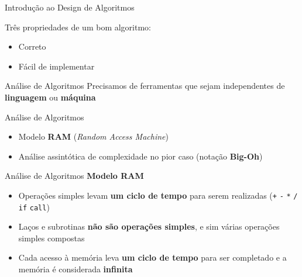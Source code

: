 \documentclass[10pt]{beamer}
\subtitle{Aula 2}
\date{01 de novembro de 2019}
\begin{document}
\maketitle

\begin{frame}{Introdução ao Design de Algoritmos}
  \huge

  Três propriedades de um bom algoritmo:

  \begin{itemize}
      \item \huge Correto
      \item \huge Fácil de implementar
  \end{itemize}
\end{frame}

\begin{frame}{Análise de Algoritmos}
  \huge Precisamos de ferramentas que sejam independentes de \textbf{linguagem} ou \textbf{máquina}
\end{frame}

\begin{frame}{Análise de Algoritmos}
  \huge
  \begin{itemize}
    \item Modelo \textbf{RAM} (\textit{Random Access Machine})
    \item Análise assintótica de complexidade no pior caso (notação \textbf{Big-Oh})
  \end{itemize}
\end{frame}

\begin{frame}{Análise de Algoritmos}
  \huge \textbf{Modelo RAM}

  \Large
  \begin{itemize}
    \item Operações simples levam \textbf{um ciclo de tempo} para serem realizadas (\texttt{+} \texttt{-} \texttt{*} \texttt{/} \texttt{if} \texttt{call})
    \item Laços e subrotinas \textbf{não são operações simples}, e sim várias operações simples compostas
    \item Cada acesso à memória leva \textbf{um ciclo de tempo} para ser completado e a memória é considerada \textbf{infinita}
  \end{itemize}
\end{frame}
\end{document}

